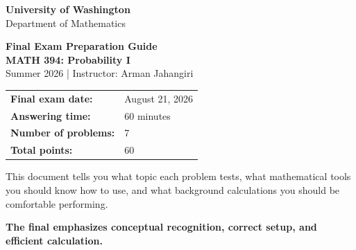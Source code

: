 \documentclass[11pt]{article}
\newcommand{\course}{MATH 394: Probability I}
\newcommand{\instructor}{Arman Jahangiri}
\newcommand{\department}{Department of Mathematics}
\newcommand{\university}{University of Washington}
\begin{document}

\begin{titlepage}
\centering
\vspace*{0.6cm}

{\Large \textbf{\university}}\\
{\large \department}

\vspace{0.8cm}

{\Huge \color{uwpurple}\textbf{Final Exam Preparation Guide}}\\[0.22cm]
{\Large \textbf{\course}}\\[0.18cm]
{\large Summer 2026 \quad | \quad Instructor: \instructor}

\vspace{0.8cm}

\begin{tcolorbox}[
    width=0.88\textwidth,
    colback=softpurple,
    colframe=uwpurple,
    boxrule=0.9pt,
    arc=3mm
]
\centering
\renewcommand{\arraystretch}{1.3}
\begin{tabular}{>{\bfseries}p{}p{}}
Final exam date: & August 21, 2026 \\
Answering time: & 60 minutes \\
Number of problems: & 7 \\
Total points: & 60 \\
\end{tabular}
\end{tcolorbox}

\vspace{0.6cm}

\begin{warningbox}
This document tells you  what topic each problem
tests, what mathematical tools you should know how to use, and what
background calculations you should be comfortable performing.

 
\end{warningbox}

\vfill

{\large\color{uwpurple}\textbf{The final emphasizes conceptual recognition,
correct setup, and efficient calculation.}}

\end{titlepage}

\end{document}
